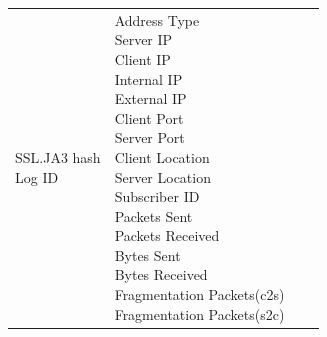 \begin{description}
\begin{longtable}{p{}|p{}|p{}|p{}}
{                                                                            SSL.JA3 hash\\
                                                                            Log ID}  &  \tabincell{l}{Address Type\\
                                                                                                    Server IP\\
                                                                                                    Client IP\\
                                                                                                    Internal IP\\
                                                                                                    External IP\\
                                                                                                    Client Port\\
                                                                                                    Server Port\\
                                                                                                    Client Location\\
                                                                                                    Server Location\\
                                                                                                    Subscriber ID\\
                                                                                                    Packets Sent\\
                                                                                                    Packets Received\\
                                                                                                    Bytes Sent\\
                                                                                                    Bytes Received\\
                                                                                                    Fragmentation Packets(c2s)\\
                                                                                                    Fragmentation Packets(s2c)\\
}
\end{longtable}
\end{description}

